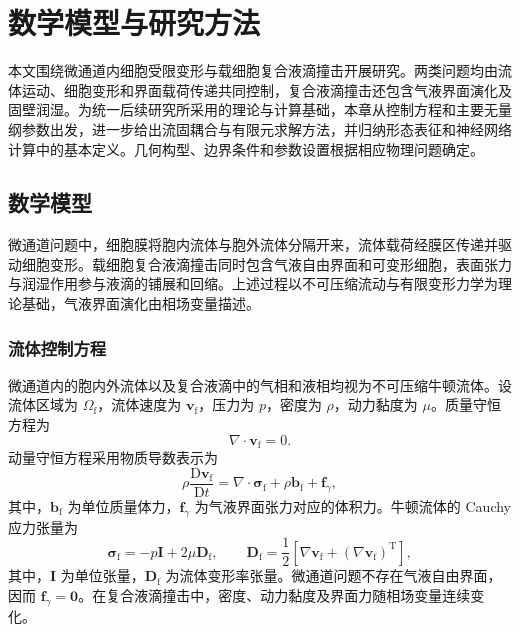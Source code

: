 \chapter{数学模型与研究方法}
\label{cha:chap02}

本文围绕微通道内细胞受限变形与载细胞复合液滴撞击开展研究。两类问题均由流体运动、细胞变形和界面载荷传递共同控制，复合液滴撞击还包含气液界面演化及固壁润湿。为统一后续研究所采用的理论与计算基础，本章从控制方程和主要无量纲参数出发，进一步给出流固耦合与有限元求解方法，并归纳形态表征和神经网络计算中的基本定义。几何构型、边界条件和参数设置根据相应物理问题确定。

\section{数学模型}
\label{sec:ch2_mathematical_model}

微通道问题中，细胞膜将胞内流体与胞外流体分隔开来，流体载荷经膜区传递并驱动细胞变形。载细胞复合液滴撞击同时包含气液自由界面和可变形细胞，表面张力与润湿作用参与液滴的铺展和回缩。上述过程以不可压缩流动与有限变形力学为理论基础，气液界面演化由相场变量描述。

\subsection{流体控制方程}
\label{subsec:ch2_fluid}

微通道内的胞内外流体以及复合液滴中的气相和液相均视为不可压缩牛顿流体。设流体区域为 $\Omega_{\mathrm f}$，流体速度为 $\boldsymbol{v}_{\mathrm f}$，压力为 $p$，密度为 $\rho$，动力黏度为 $\mu$。质量守恒方程为
\begin{equation}
\nabla\cdot\boldsymbol{v}_{\mathrm f}=0.
\label{eq:ch2_continuity}
\end{equation}
动量守恒方程采用物质导数表示为
\begin{equation}
\rho\frac{\mathrm{D}\boldsymbol{v}_{\mathrm f}}{\mathrm{D} t}
=
\nabla\cdot\boldsymbol{\sigma}_{\mathrm f}
+
\rho\boldsymbol{b}_{\mathrm f}
+
\boldsymbol{f}_{\gamma},
\label{eq:ch2_fluid_momentum}
\end{equation}
其中，$\boldsymbol{b}_{\mathrm f}$ 为单位质量体力，$\boldsymbol{f}_{\gamma}$ 为气液界面张力对应的体积力。牛顿流体的 Cauchy 应力张量为
\begin{equation}
\boldsymbol{\sigma}_{\mathrm f}
=
-p\boldsymbol{I}
+2\mu\boldsymbol{D}_{\mathrm f},
\qquad
\boldsymbol{D}_{\mathrm f}
=
\frac{1}{2}
\left[
\nabla\boldsymbol{v}_{\mathrm f}
+
\left(\nabla\boldsymbol{v}_{\mathrm f}\right)^{\mathrm T}
\right],
\label{eq:ch2_fluid_stress}
\end{equation}
其中，$\boldsymbol{I}$ 为单位张量，$\boldsymbol{D}_{\mathrm f}$ 为流体变形率张量。微通道问题不存在气液自由界面，因而 $\boldsymbol{f}_{\gamma}=\boldsymbol{0}$。在复合液滴撞击中，密度、动力黏度及界面力随相场变量连续变化。

